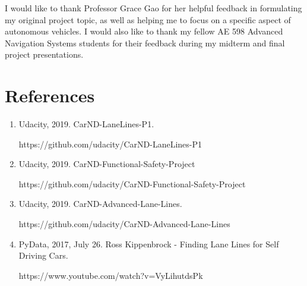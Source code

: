 \documentclass[conf]{new-aiaa}
\begin{document}
I would like to thank Professor Grace Gao for her helpful feedback in formulating my original project topic, as well as helping me to focus on a specific aspect of autonomous vehicles.  I would also like to thank my fellow AE 598 Advanced Navigation Systems students for their feedback during my midterm and final project presentations.


\section*{References}
\begin{enumerate}
    \item Udacity, 2019.  CarND-LaneLines-P1.

    https://github.com/udacity/CarND-LaneLines-P1


    \item Udacity, 2019.  CarND-Functional-Safety-Project

    https://github.com/udacity/CarND-Functional-Safety-Project

    \item Udacity, 2019.  CarND-Advanced-Lane-Lines.

    https://github.com/udacity/CarND-Advanced-Lane-Lines


    \item PyData, 2017, July 26.  Ross Kippenbrock - Finding Lane Lines for Self Driving Cars.

    https://www.youtube.com/watch?v=VyLihutdsPk

  \end{enumerate}
\end{document}
